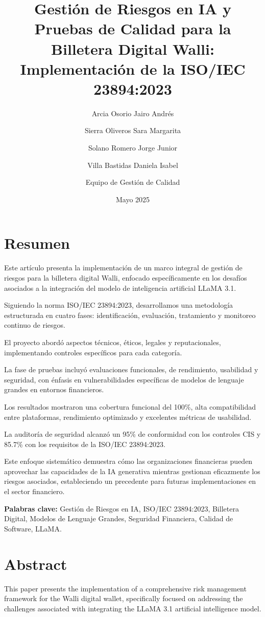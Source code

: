 \documentclass[12pt]{article}
\title{\textbf{Gestión de Riesgos en IA y Pruebas de Calidad para la Billetera Digital Walli: Implementación de la ISO/IEC 23894:2023}}
\author{Arcia Osorio Jairo Andrés \and Sierra Oliveros Sara Margarita \and Solano Romero Jorge Junior \and Villa Bastidas Daniela Isabel \and Equipo de Gestión de Calidad}
\date{Mayo 2025}
\begin{document}
\maketitle

\tableofcontents
\newpage

\section{Resumen}
Este artículo presenta la implementación de un marco integral de gestión de riesgos para la billetera digital Walli, enfocado específicamente en los desafíos asociados a la integración del modelo de inteligencia artificial LLaMA 3.1. 

Siguiendo la norma ISO/IEC 23894:2023, desarrollamos una metodología estructurada en cuatro fases: identificación, evaluación, tratamiento y monitoreo continuo de riesgos. 

El proyecto abordó aspectos técnicos, éticos, legales y reputacionales, implementando controles específicos para cada categoría. 

La fase de pruebas incluyó evaluaciones funcionales, de rendimiento, usabilidad y seguridad, con énfasis en vulnerabilidades específicas de modelos de lenguaje grandes en entornos financieros. 

Los resultados mostraron una cobertura funcional del 100\%, alta compatibilidad entre plataformas, rendimiento optimizado y excelentes métricas de usabilidad. 

La auditoría de seguridad alcanzó un 95\% de conformidad con los controles CIS y 85.7\% con los requisitos de la ISO/IEC 23894:2023. 

Este enfoque sistemático demuestra cómo las organizaciones financieras pueden aprovechar las capacidades de la IA generativa mientras gestionan eficazmente los riesgos asociados, estableciendo un precedente para futuras implementaciones en el sector financiero.


\textbf{Palabras clave:} Gestión de Riesgos en IA, ISO/IEC 23894:2023, Billetera Digital, Modelos de Lenguaje Grandes, Seguridad Financiera, Calidad de Software, LLaMA.

\section{Abstract}
This paper presents the implementation of a comprehensive risk management framework for the Walli digital wallet, specifically focused on addressing the challenges associated with integrating the LLaMA 3.1 artificial intelligence model. 
\end{document}

